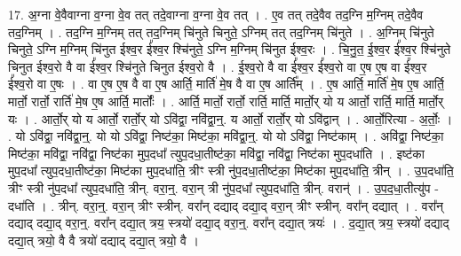 \documentclass[17pt]{extarticle}
\begin{document}
17. अ॒ग्ना वे॒वैवाग्ना व॒ग्ना वे॒व तत् तदे॒वाग्ना व॒ग्ना वे॒व तत् । . ए॒व तत् तदे॒वैव तद॒ग्नि म॒ग्निम् तदे॒वैव तद॒ग्निम् । . तद॒ग्नि म॒ग्निम् तत् तद॒ग्निम् चि॑नुते चिनुते॒ ऽग्निम् तत् तद॒ग्निम् चि॑नुते । . अ॒ग्निम् चि॑नुते चिनुते॒ ऽग्नि म॒ग्निम् चि॑नुत ईश्व॒र ई᳚श्व॒र श्चि॑नुते॒ ऽग्नि म॒ग्निम् चि॑नुत ईश्व॒रः । . चि॒नु॒त॒ ई॒श्व॒र ई᳚श्व॒र श्चि॑नुते चिनुत ईश्व॒रो वै वा ई᳚श्व॒र श्चि॑नुते चिनुत ईश्व॒रो वै । . ई॒श्व॒रो वै वा ई᳚श्व॒र ई᳚श्व॒रो वा ए॒ष ए॒ष वा ई᳚श्व॒र ई᳚श्व॒रो वा ए॒षः । . वा ए॒ष ए॒ष वै वा ए॒ष आर्ति॒ मार्ति॑ मे॒ष वै वा ए॒ष आर्ति᳚म् । . ए॒ष आर्ति॒ मार्ति॑ मे॒ष ए॒ष आर्ति॒ मार्तो॒ रार्तो॒ रार्ति॑ मे॒ष ए॒ष आर्ति॒ मार्तोः᳚ । . आर्ति॒ मार्तो॒ रार्तो॒ रार्ति॒ मार्ति॒ मार्तो॒र् यो य आर्तो॒ रार्ति॒ मार्ति॒ मार्तो॒र् यः । . आर्तो॒र् यो य आर्तो॒ रार्तो॒र् यो ऽवि॑द्वा॒ नवि॑द्वा॒न्॒. य आर्तो॒ रार्तो॒र् यो ऽवि॑द्वान् । . आर्तो॒रित्या - अ॒र्तोः॒ । . यो ऽवि॑द्वा॒ नवि॑द्वा॒न्॒. यो यो ऽवि॑द्वा॒ निष्ट॑का॒ मिष्ट॑का॒ मवि॑द्वा॒न्॒. यो यो ऽवि॑द्वा॒ निष्ट॑काम् । . अवि॑द्वा॒ निष्ट॑का॒ मिष्ट॑का॒ मवि॑द्वा॒ नवि॑द्वा॒ निष्ट॑का मुप॒दधा᳚ त्युप॒दधा॒तीष्ट॑का॒ मवि॑द्वा॒ नवि॑द्वा॒ निष्ट॑का मुप॒दधा॑ति । . इष्ट॑का मुप॒दधा᳚ त्युप॒दधा॒तीष्ट॑का॒ मिष्ट॑का मुप॒दधा॑ति॒ त्रीꣳ स्त्री नु॑प॒दधा॒तीष्ट॑का॒ मिष्ट॑का मुप॒दधा॑ति॒ त्रीन् । . उ॒प॒दधा॑ति॒ त्रीꣳ स्त्री नु॑प॒दधा᳚ त्युप॒दधा॑ति॒ त्रीन्. वरा॒न्॒. वरा॒न् त्री नु॑प॒दधा᳚ त्युप॒दधा॑ति॒ त्रीन्. वरान्॑ । . उ॒प॒द॒धा॒तीत्यु॑प - दधा॑ति । . त्रीन्. वरा॒न्॒. वरा॒न् त्रीꣳ स्त्रीन्. वरा᳚न् दद्याद् दद्या॒द् वरा॒न् त्रीꣳ स्त्रीन्. वरा᳚न् दद्यात् । . वरा᳚न् दद्याद् दद्या॒द् वरा॒न्॒. वरा᳚न् दद्या॒त् त्रय॒ स्त्रयो॑ दद्या॒द् वरा॒न्॒. वरा᳚न् दद्या॒त् त्रयः॑ । . द॒द्या॒त् त्रय॒ स्त्रयो॑ दद्याद् दद्या॒त् त्रयो॒ वै वै त्रयो॑ दद्याद् दद्या॒त् त्रयो॒ वै । \newline
\end{document}

